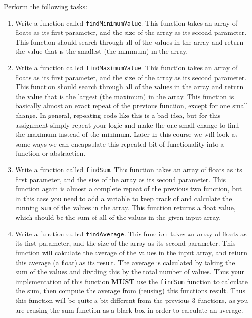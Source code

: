 \documentclass[11pt]{article}
\begin{document}
Perform the following tasks:

\begin{enumerate}
\item Write a function called \verb~findMinimumValue~.  This function takes
an array of floats as its first parameter, and the size of the
array as its second parameter.  This function should search through
all of the values in the array and return the value that is the
smallest (the minimum) in the array.

\item Write a function called \verb~findMaximumValue~.  This function takes an
array of floats as its first parameter, and the size of the array
as its second parameter.  This function should search through all
of the values in the array and return the value that is the largest
(the maximum) in the array.  This function is basically almost an
exact repeat of the previous function, except for one small change.
In general, repeating code like this is a bad idea, but for this
assignment simply repeat your logic and make the one small change
to find the maximum instead of the minimum.  Later in this course
we will look at some ways we can encapsulate this repeated bit of
functionality into a function or abstraction.

\item Write a function called \verb~findSum~.  This function takes an
array of floats as its first parameter, and the size of the array
as its second parameter.  This function again is almost a complete
repeat of the previous two function, but in this case you need to
add a variable to keep track of and calculate the running \verb~sum~ of
the values in the array.  This function returns a float value,
which should be the sum of all of the values in the given input
array.

\item Write a function called \verb~findAverage~.  This function takes
an array of floats as its first parameter, and the size of the array
as its second parameter.  This function will calculate the average
of the values in the input array, and return this average (a float)
as its result.  The average is calculated by taking the sum of the
values and dividing this by the total number of values.  Thus
your implementation of this function \textbf{MUST} use the \verb~findSum~
function to calculate the sum, then compute the average from
(reusing) this functions result.  Thus this function will be quite a
bit different from the previous 3 functions, as you are reusing the
sum function as a black box in order to calculate an average.


\end{enumerate}
\end{document}
